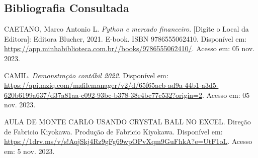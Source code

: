 \documentclass[a4paper,12pt]{article}[abntex2]
\begin{document}
\newpage
\begin{thebibliography}{9}
\section{Bibliografia Consultada}
CAETANO, Marco Antonio L. 
\textit{Python e mercado financeiro}. 
[Digite o Local da Editora]: Editora Blucher, 2021. E-book. ISBN 9786555062410. 
Disponível em: \href{https://app.minhabiblioteca.com.br//books/9786555062410/}{https://app.minhabiblioteca.com.br//books/9786555062410/}. 
Acesso em: 05 nov. 2023.

CAMIL. 
\textit{Demonstração contábil 2022}. 
Disponível em: \href{https://api.mziq.com/mzfilemanager/v2/d/65f65acb-ad9a-44b1-a3d5-620b6199a637/d37a81aa-c092-93bc-b378-38e4bc77c532?origin=2}{https://api.mziq.com/mzfilemanager/v2/d/65f65acb-ad9a-44b1-a3d5-620b6199a637/d37a81aa-c092-93bc-b378-38e4bc77c532?origin=2}. 
Acesso em: 05 nov. 2023.

AULA DE MONTE CARLO USANDO CRYSTAL BALL NO EXCEL. 
Direção de Fabricio Kiyokawa. Produção de Fabricio Kiyokawa.
Disponível em: \href{https://1drv.ms/v/s!AqjSkj4Rz9gFg69wpOPvXqm9GuFhkA?e=UtF1oL}{https://1drv.ms/v/s!AqjSkj4Rz9gFg69wpOPvXqm9GuFhkA?e=UtF1oL}. 
Acesso em: 5 nov. 2023.
\end{thebibliography}

\newpage
\appendix
\end{document}
